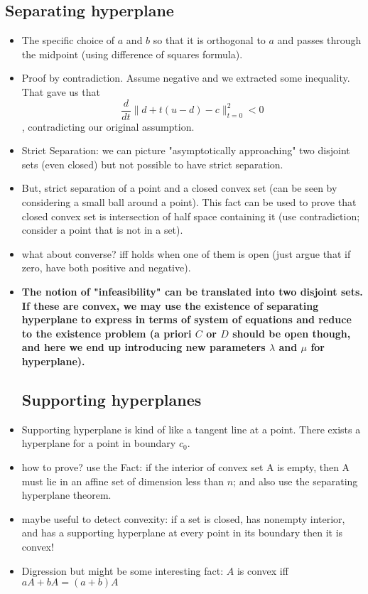 \documentclass{article}
\theoremstyle{remark}
\begin{document}
\subsection*{Separating hyperplane}
\begin{itemize}
    \item The specific choice of $a$ and $b$ so that it is orthogonal to $a$ and passes through the midpoint (using difference of squares formula).
    \item Proof by contradiction. Assume negative and we extracted some inequality. That gave us that $$\frac d{dt}\lVert d+t(u-d)-c\rVert^2_{t=0}<0$$, contradicting our original assumption.

    \item Strict Separation: we can picture "asymptotically approaching" two disjoint sets (even closed) but not possible to have strict separation.
    \item But, strict separation of a point and a closed convex set (can be seen by considering a small ball around a point). This fact can be used to prove that closed convex set is intersection of half space containing it (use contradiction; consider a point that is not in a set). 
    \item what about converse? iff holds when one of them is open (just argue that if zero, have both positive and negative).
    \item \textbf{The notion of "infeasibility" can be translated into two disjoint sets. If these are convex, we may use the existence of separating hyperplane to express in terms of system of equations and reduce to the existence problem (a priori $C$ or $D$ should be open though, and here we end up introducing new parameters $\lambda$ and $\mu$ for hyperplane).}
    
    \subsection*{Supporting hyperplanes}
    \item Supporting hyperplane is kind of like a tangent line at a point. There exists a hyperplane for a point in boundary $c_0$.
    \item how to prove? use the Fact: if the interior of convex set A is empty, then A must lie in an affine set of dimension less than $n$; and also use the separating hyperplane theorem.
    \item maybe useful to detect convexity: if a set is closed, has nonempty interior, and has a supporting hyperplane at every point in its boundary then it is convex!
    \item Digression but might be some interesting fact: $A$ is convex iff $aA+bA=(a+b)A$

\end{itemize}
\end{document}
